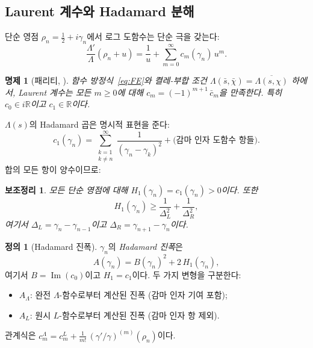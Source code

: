 \documentclass[11pt,a4paper]{article}
\theoremstyle{plain}
\newtheorem{proposition}[theorem]{명제}
\newtheorem{lemma}[theorem]{보조정리}
\theoremstyle{definition}
\newtheorem{definition}[theorem]{정의}
\newcommand{\La}{\Lambda}
\begin{document}
\subsection{Laurent 계수와 Hadamard 분해}

단순 영점 $\rho_n = \tfrac{1}{2} + i\gamma_n$에서
로그 도함수는 단순 극을 갖는다:
\[
  \frac{\La'}{\La}(\rho_n + u) = \frac{1}{u}
  + \sum_{m=0}^{\infty} c_m(\gamma_n)\, u^m.
\]

\begin{proposition}[패리티, {\cite[정리~5]{paper2}}]\label{prop:parity}
함수 방정식~\eqref{eq:FE}와 켤레-부합 조건
$\La(\bar{s}, \bar{\chi}) = \overline{\La(s,\chi)}$ 하에서,
Laurent 계수는 모든 $m \ge 0$에 대해
$c_m = (-1)^{m+1}\,\bar{c}_m$을 만족한다.
특히 $c_0 \in i\mathbb{R}$이고 $c_1 \in \mathbb{R}$이다.
\end{proposition}

$\La(s)$의 Hadamard 곱은 명시적 표현을 준다:
\begin{equation}\label{eq:hadamard_c1}
  c_1(\gamma_n) = \sum_{\substack{k=1 \\ k \ne n}}^{\infty}
  \frac{1}{(\gamma_n - \gamma_k)^2}
  + \text{(감마 인자 도함수 항들)}.
\end{equation}
합의 모든 항이 양수이므로:

\begin{lemma}\label{lem:H1_positive}
모든 단순 영점에 대해 $H_1(\gamma_n) = c_1(\gamma_n) > 0$이다.
또한
\begin{equation}\label{eq:H1_NN}
  H_1(\gamma_n) \ge \frac{1}{\Delta_L^2} + \frac{1}{\Delta_R^2},
\end{equation}
여기서 $\Delta_L = \gamma_n - \gamma_{n-1}$이고
$\Delta_R = \gamma_{n+1} - \gamma_n$이다.
\end{lemma}

\begin{definition}[Hadamard 진폭]\label{def:amplitude}
$\gamma_n$의 \emph{Hadamard 진폭}은
\[
  A(\gamma_n) = B(\gamma_n)^2 + 2\,H_1(\gamma_n),
\]
여기서 $B = \operatorname{Im}(c_0)$이고 $H_1 = c_1$이다.
두 가지 변형을 구분한다:
\begin{itemize}
  \item $A_\La$: 완전 $\La$-함수로부터 계산된 진폭
        (감마 인자 기여 포함);
  \item $A_L$: 원시 $L$-함수로부터 계산된 진폭
        (감마 인자 항 제외).
\end{itemize}
관계식은
$c_m^\La = c_m^L + \frac{1}{m!}\,(\gamma'/\gamma)^{(m)}(\rho_n)$이다.
\end{definition}
\end{document}

